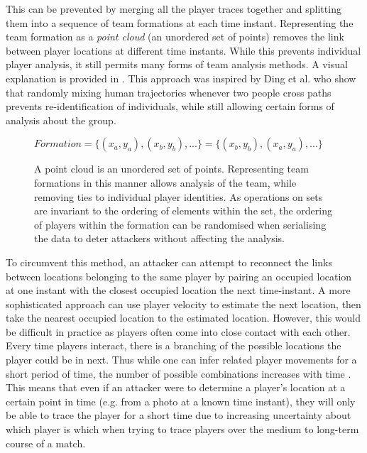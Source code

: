 This can be prevented by merging all the player traces together and splitting them into a sequence of team formations at each time instant. Representing the team formation as a \textit{point cloud} (an unordered set of points) removes the link between player locations at different time instants. While this prevents individual player analysis, it still permits many forms of team analysis methods. %
A visual explanation is provided in . This approach was inspired by Ding et al. \cite{Ding2017} who show that randomly mixing human trajectories whenever two people cross paths prevents re-identification of individuals, while still allowing certain forms of analysis about the group.


\begin{figure}
  \centering
  $Formation = \{(x_a, y_a), (x_b, y_b), ...\} = \{(x_b, y_b), (x_a, y_a), ...\}$
  \caption{A point cloud is an unordered set of points. Representing team formations in this manner allows analysis of the team, while removing ties to individual player identities. As operations on sets are invariant to the ordering of elements within the set, the ordering of players within the formation can be randomised when serialising the data to deter attackers without affecting the analysis.}
  \label{fig:pointcloud}
\end{figure}


To circumvent this method, an attacker can attempt to reconnect the links between locations belonging to the same player by pairing an occupied location at one instant with the closest occupied location the next time-instant. A more sophisticated approach can use player velocity to estimate the next location, then take the nearest occupied location to the estimated location. However, this would be difficult in practice as players often come into close contact with each other. Every time players interact, there is a branching of the possible locations the player could be in next. Thus while one can infer related player movements for a short period of time, the number of possible combinations increases with time \cite{Ding2017}. This means that even if an attacker were to determine a player's location at a certain point in time (e.g. from a photo at a known time instant), they will only be able to trace the player for a short time due to increasing uncertainty about which player is which when trying to trace players over the medium to long-term course of a match.

